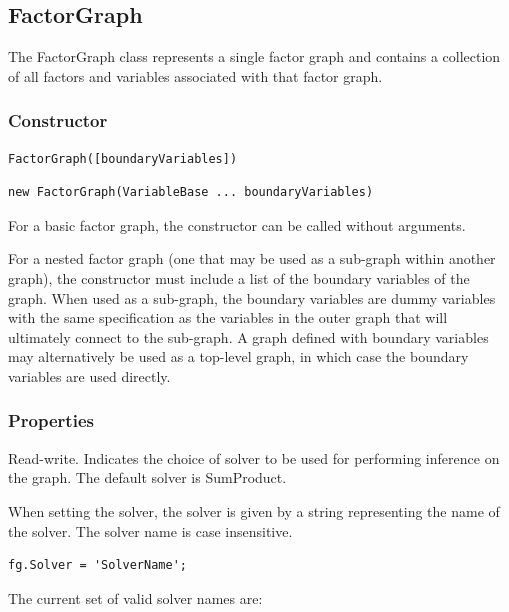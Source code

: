 \subsection{FactorGraph}

The FactorGraph class represents a single factor graph and contains a collection of all factors and variables associated with that factor graph.

\subsubsection{Constructor}

\ifmatlab
\begin{lstlisting}
FactorGraph([boundaryVariables])
\end{lstlisting}
\fi

\ifjava
\begin{lstlisting}
new FactorGraph(VariableBase ... boundaryVariables)
\end{lstlisting}
\fi

For a basic factor graph, the constructor can be called without arguments.

For a nested factor graph (one that may be used as a sub-graph within another graph), the constructor must include a list of the boundary variables of the graph.  When used as a sub-graph, the boundary variables are dummy variables with the same specification as the variables in the outer graph that will ultimately connect to the sub-graph.  A graph defined with boundary variables may alternatively be used as a top-level graph, in which case the boundary variables are used directly.

\subsubsection{Properties}

\label{sec:FactorGraph.Solver}

Read-write.  Indicates the choice of solver to be used for performing inference on the graph.  The default solver is SumProduct.

When setting the solver, the solver is given by a string representing the name of the solver.  The solver name is case insensitive.

\ifmatlab
\begin{lstlisting}
fg.Solver = 'SolverName';
\end{lstlisting}

The current set of valid solver names are:

